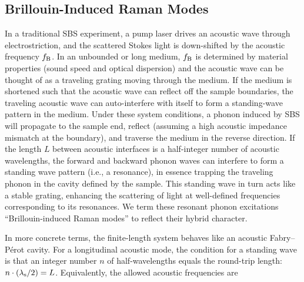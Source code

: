 \subsection{Brillouin-Induced Raman Modes}
\label{subsec:Raman:Brillouin-InducedRamanModes}

In a traditional SBS experiment, a pump laser drives an acoustic wave through electrostriction, and the scattered Stokes light is down-shifted by the acoustic frequency \(f_{\rm B}\). In an unbounded or long medium, \(f_{\rm B}\) is determined by material properties (sound speed and optical dispersion) and the acoustic wave can be thought of as a traveling grating moving through the medium. If the medium is shortened such that the acoustic wave can reflect off the sample boundaries, the traveling acoustic wave can auto-interfere with itself to form a standing-wave pattern in the medium. Under these system conditions, a phonon induced by \ac{SBS} will propagate to the sample end, reflect (assuming a high acoustic impedance mismatch at the boundary), and traverse the medium in the reverse direction. If the length \(L\) between acoustic interfaces is a half-integer number of acoustic wavelengths, the forward and backward phonon waves can interfere to form a standing wave pattern (i.e., a resonance), in essence trapping the traveling phonon in the cavity defined by the sample. This standing wave in turn acts like a stable grating, enhancing the scattering of light at well-defined frequencies corresponding to its resonances. We term these resonant phonon excitations “Brillouin-induced Raman modes” to reflect their hybrid character.

In more concrete terms, the finite-length system behaves like an acoustic Fabry–Pérot cavity. For a longitudinal acoustic mode, the condition for a standing wave is that an integer number \(n\) of half-wavelengths equals the round-trip length: \(n \cdot (\lambda_{\rm s}/2) = L\). Equivalently, the allowed acoustic frequencies are

